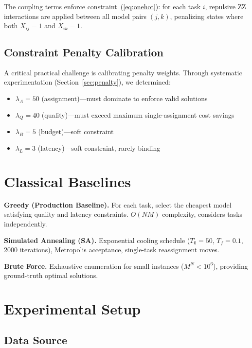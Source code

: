 \documentclass[conference]{IEEEtran}
\begin{document}
The coupling terms enforce constraint~(\ref{eq:onehot}): for each task $i$, repulsive ZZ interactions are applied between all model pairs $(j,k)$, penalizing states where both $X_{ij}=1$ and $X_{ik}=1$.

\subsection{Constraint Penalty Calibration}

A critical practical challenge is calibrating penalty weights. Through systematic experimentation (Section~\ref{sec:penalty}), we determined:

\begin{itemize}
    \item $\lambda_A = 50$ (assignment)---must dominate to enforce valid solutions
    \item $\lambda_Q = 40$ (quality)---must exceed maximum single-assignment cost savings
    \item $\lambda_B = 5$ (budget)---soft constraint
    \item $\lambda_L = 3$ (latency)---soft constraint, rarely binding
\end{itemize}

\section{Classical Baselines}

\textbf{Greedy (Production Baseline).} For each task, select the cheapest model satisfying quality and latency constraints. $O(NM)$ complexity, considers tasks independently.

\textbf{Simulated Annealing (SA).} Exponential cooling schedule ($T_0\!=\!50$, $T_f\!=\!0.1$, 2000 iterations), Metropolis acceptance, single-task reassignment moves.

\textbf{Brute Force.} Exhaustive enumeration for small instances ($M^N < 10^6$), providing ground-truth optimal solutions.

\section{Experimental Setup}

\subsection{Data Source}
\end{document}
